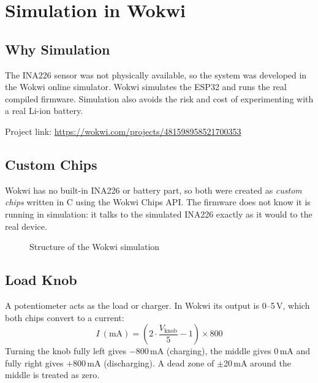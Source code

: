 \documentclass[12pt,a4paper,oneside]{report}
\newcommand{\wokwiurl}{https://wokwi.com/projects/481598958521700353}
\begin{document}
\chapter{Simulation in Wokwi}\label{ch:sim}

\section{Why Simulation}
The INA226 sensor was not physically available, so the system was developed in the Wokwi online simulator. Wokwi simulates the ESP32 and runs the real compiled firmware. Simulation also avoids the risk and cost of experimenting with a real Li-ion battery.

Project link: \url{\wokwiurl}

\section{Custom Chips}
Wokwi has no built-in INA226 or battery part, so both were created as \emph{custom chips} written in C using the Wokwi Chips API. The firmware does not know it is running in simulation: it talks to the simulated INA226 exactly as it would to the real device.

\begin{figure}[H]
\centering
{}
\caption{Structure of the Wokwi simulation}
\label{fig:simblock}
\end{figure}

\section{Load Knob}
A potentiometer acts as the load or charger. In Wokwi its output is 0--5\,V, which both chips convert to a current:
\begin{equation}
  I\ (\text{mA}) = \left( 2 \cdot \frac{V_{\text{knob}}}{5} - 1 \right) \times 800
\end{equation}
Turning the knob fully left gives $-800$\,mA (charging), the middle gives 0\,mA and fully right gives $+800$\,mA (discharging). A dead zone of $\pm$20\,mA around the middle is treated as zero.
\end{document}
